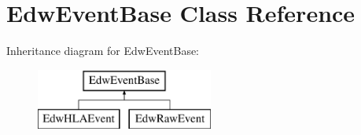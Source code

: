 \hypertarget{class_edw_event_base}{
\section{EdwEventBase Class Reference}
\label{class_edw_event_base}
}
Inheritance diagram for EdwEventBase:\begin{figure}[H]
\begin{center}
\leavevmode
\includegraphics[height=2cm]{class_edw_event_base}
\end{center}
\end{figure}
